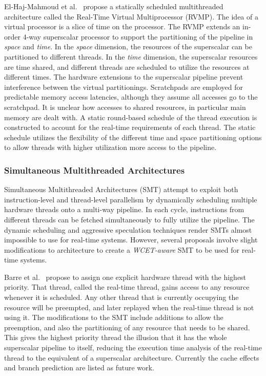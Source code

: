 El-Haj-Mahmoud et al.~\cite{El-Haj-Mahmoud2005VirtualMultiprocessor} propose a statically scheduled multithreaded architecture called the Real-Time Virtual Multiprocessor (RVMP).   
The idea of a virtual processor is a slice of time on the processor. 
The RVMP extends an in-order 4-way superscalar processor to support the partitioning of the pipeline in \emph{space} and \emph{time}.  
In the \emph{space} dimension, the resources of the superscalar can be partitioned to different threads. 
In the \emph{time} dimension, the superscalar resources are time shared, and different threads are scheduled to utilize the resources at different times.  
The hardware extensions to the superscalar pipeline prevent interference between the virtual partitionings.
Scratchpads are employed for predictable memory access latencies, although they assume all accesses go to the scratchpad. 
It is unclear how accesses to shared resources, in particular main memory are dealt with.
A static round-based schedule of the thread execution is constructed to account for the real-time requirements of each thread.
The static schedule utilizes the flexibility of the different time and space partitioning options to allow threads with higher utilization more access to the pipeline. 

\subsubsection{Simultaneous Multithreaded Architectures} 
\label{sec:RTSMT}
Simultaneous Multithreaded Architectures (SMT) attempt to exploit both instruction-level and thread-level parallelism by dynamically scheduling multiple hardware threads onto a multi-way pipeline. 
In each cycle, instructions from different threads can be fetched simultaneously to fully utilize the pipeline.
The dynamic scheduling and aggressive speculation techniques render SMTs almost impossible to use for real-time systems.  
However, several proposals involve slight modifications to architecture to create a \emph{WCET-aware} SMT to be used for real-time systems.  

Barre et al.~\cite{Barre2008RTSMT} propose to assign one explicit hardware thread with the highest priority. 
That thread, called the real-time thread, gains access to any resource whenever it is scheduled. 
Any other thread that is currently occupying the resource will be preempted, and later replayed when the real-time thread is not using it.
The modifications to the SMT include additions to allow the preemption, and also the partitioning of any resource that needs to be shared. 
This gives the highest priority thread the illusion that it has the whole superscalar pipeline to itself, reducing the execution time analysis of the real-time thread to the equivalent of a superscalar architecture. 
Currently the cache effects and branch prediction are listed as future work.  

